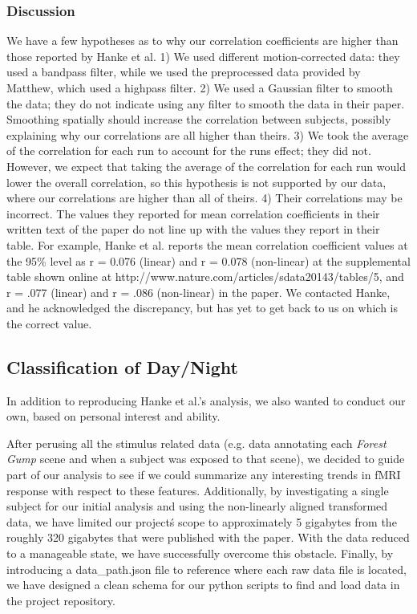 \subsubsection{Discussion}

We have a few hypotheses as to why our correlation coefficients are 
higher than those reported by Hanke et al.  1) We used 
different motion-corrected data: they used a bandpass filter, while we 
used the preprocessed data provided by Matthew, which used a highpass
filter.  2) We used a Gaussian filter to smooth the data; they do not 
indicate using any filter to smooth the data in their paper.  Smoothing 
spatially should increase the correlation between subjects, possibly 
explaining why our correlations are all higher than theirs.  3) We 
took the average of the correlation for each run to account for the runs
effect; they did not.  However, we expect that taking the average of 
the correlation for each run would lower the overall correlation, so
this hypothesis is not supported by our data, where our correlations
are higher than all of theirs.   4) Their correlations may be incorrect.
The values they reported for mean correlation coefficients in their 
written text of the paper do not line up with the values they report in 
their table.  For example, Hanke et al. reports the mean correlation 
coefficient values at the 95\% level as r = 0.076 (linear) and r = 0.078 
(non-linear) at the supplemental table shown online at
http://www.nature.com/articles/sdata20143/tables/5, and r = .077 (linear) 
and r = .086 (non-linear) in the paper.  We contacted Hanke, and he acknowledged 
the discrepancy, but has yet to get back to us on which is the correct value.  

\subsection{Classification of Day/Night}

In addition to reproducing Hanke et al.'s analysis, we also wanted to
conduct our own, based on personal interest and ability.

After perusing all the stimulus related data (e.g. data annotating each 
\emph{Forest Gump} scene and when a subject was exposed to
that scene), we decided to guide part of our analysis to see if we could
summarize any interesting trends in fMRI response with respect to these
features. Additionally, by investigating a single subject for our initial
analysis  and using the non-linearly aligned transformed data, we have limited
our project\'s scope to approximately 5 gigabytes from the roughly 320
gigabytes that were published with the paper. With the data reduced to a
manageable state, we have successfully overcome this obstacle. Finally, by
introducing a data\_path.json file to reference where each raw data file is
located, we have designed a clean schema for our python scripts to find and
load data in the project repository.

